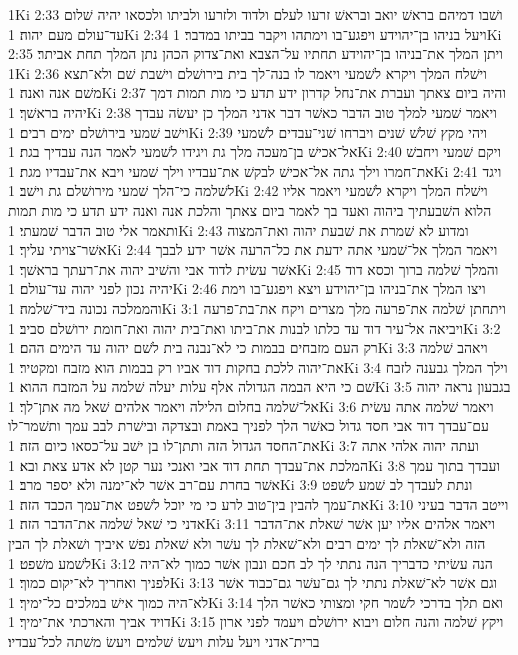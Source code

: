 1Ki 2:33  ושׁבו דמיהם בראשׁ יואב ובראשׁ זרעו לעלם ולדוד ולזרעו ולביתו ולכסאו יהיה שׁלום עד־עולם מעם יהוה׃
1Ki 2:34  ויעל בניהו בן־יהוידע ויפגע־בו וימתהו ויקבר בביתו במדבר׃
1Ki 2:35  ויתן המלך את־בניהו בן־יהוידע תחתיו על־הצבא ואת־צדוק הכהן נתן המלך תחת אביתר׃
1Ki 2:36  וישׁלח המלך ויקרא לשׁמעי ויאמר לו בנה־לך בית בירושׁלם וישׁבת שׁם ולא־תצא משׁם אנה ואנה׃
1Ki 2:37  והיה ביום צאתך ועברת את־נחל קדרון ידע תדע כי מות תמות דמך יהיה בראשׁך׃
1Ki 2:38  ויאמר שׁמעי למלך טוב הדבר כאשׁר דבר אדני המלך כן יעשׂה עבדך וישׁב שׁמעי בירושׁלם ימים רבים׃
1Ki 2:39  ויהי מקץ שׁלשׁ שׁנים ויברחו שׁני־עבדים לשׁמעי אל־אכישׁ בן־מעכה מלך גת ויגידו לשׁמעי לאמר הנה עבדיך בגת׃
1Ki 2:40  ויקם שׁמעי ויחבשׁ את־חמרו וילך גתה אל־אכישׁ לבקשׁ את־עבדיו וילך שׁמעי ויבא את־עבדיו מגת׃
1Ki 2:41  ויגד לשׁלמה כי־הלך שׁמעי מירושׁלם גת וישׁב׃
1Ki 2:42  וישׁלח המלך ויקרא לשׁמעי ויאמר אליו הלוא השׁבעתיך ביהוה ואעד בך לאמר ביום צאתך והלכת אנה ואנה ידע תדע כי מות תמות ותאמר אלי טוב הדבר שׁמעתי׃
1Ki 2:43  ומדוע לא שׁמרת את שׁבעת יהוה ואת־המצוה אשׁר־צויתי עליך׃
1Ki 2:44  ויאמר המלך אל־שׁמעי אתה ידעת את כל־הרעה אשׁר ידע לבבך אשׁר עשׂית לדוד אבי והשׁיב יהוה את־רעתך בראשׁך׃
1Ki 2:45  והמלך שׁלמה ברוך וכסא דוד יהיה נכון לפני יהוה עד־עולם׃
1Ki 2:46  ויצו המלך את־בניהו בן־יהוידע ויצא ויפגע־בו וימת והממלכה נכונה ביד־שׁלמה׃
1Ki 3:1  ויתחתן שׁלמה את־פרעה מלך מצרים ויקח את־בת־פרעה ויביאה אל־עיר דוד עד כלתו לבנות את־ביתו ואת־בית יהוה ואת־חומת ירושׁלם סביב׃
1Ki 3:2  רק העם מזבחים בבמות כי לא־נבנה בית לשׁם יהוה עד הימים ההם׃
1Ki 3:3  ויאהב שׁלמה את־יהוה ללכת בחקות דוד אביו רק בבמות הוא מזבח ומקטיר׃
1Ki 3:4  וילך המלך גבענה לזבח שׁם כי היא הבמה הגדולה אלף עלות יעלה שׁלמה על המזבח ההוא׃
1Ki 3:5  בגבעון נראה יהוה אל־שׁלמה בחלום הלילה ויאמר אלהים שׁאל מה אתן־לך׃
1Ki 3:6  ויאמר שׁלמה אתה עשׂית עם־עבדך דוד אבי חסד גדול כאשׁר הלך לפניך באמת ובצדקה ובישׁרת לבב עמך ותשׁמר־לו את־החסד הגדול הזה ותתן־לו בן ישׁב על־כסאו כיום הזה׃
1Ki 3:7  ועתה יהוה אלהי אתה המלכת את־עבדך תחת דוד אבי ואנכי נער קטן לא אדע צאת ובא׃
1Ki 3:8  ועבדך בתוך עמך אשׁר בחרת עם־רב אשׁר לא־ימנה ולא יספר מרב׃
1Ki 3:9  ונתת לעבדך לב שׁמע לשׁפט את־עמך להבין בין־טוב לרע כי מי יוכל לשׁפט את־עמך הכבד הזה׃
1Ki 3:10  וייטב הדבר בעיני אדני כי שׁאל שׁלמה את־הדבר הזה׃
1Ki 3:11  ויאמר אלהים אליו יען אשׁר שׁאלת את־הדבר הזה ולא־שׁאלת לך ימים רבים ולא־שׁאלת לך עשׁר ולא שׁאלת נפשׁ איביך ושׁאלת לך הבין לשׁמע משׁפט׃
1Ki 3:12  הנה עשׂיתי כדבריך הנה נתתי לך לב חכם ונבון אשׁר כמוך לא־היה לפניך ואחריך לא־יקום כמוך׃
1Ki 3:13  וגם אשׁר לא־שׁאלת נתתי לך גם־עשׁר גם־כבוד אשׁר לא־היה כמוך אישׁ במלכים כל־ימיך׃
1Ki 3:14  ואם תלך בדרכי לשׁמר חקי ומצותי כאשׁר הלך דויד אביך והארכתי את־ימיך׃
1Ki 3:15  ויקץ שׁלמה והנה חלום ויבוא ירושׁלם ויעמד לפני ארון ברית־אדני ויעל עלות ויעשׂ שׁלמים ויעשׂ משׁתה לכל־עבדיו׃
